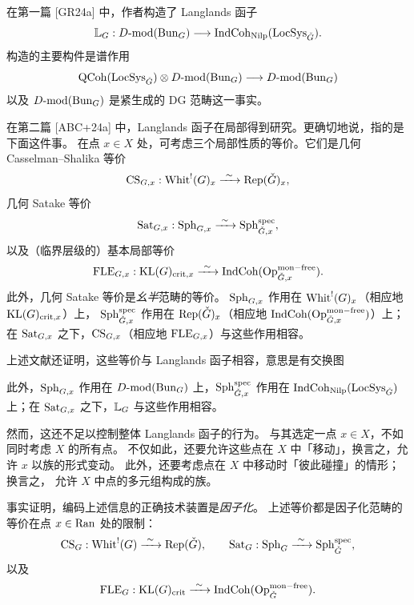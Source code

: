在第一篇 [GR24a] 中，作者构造了 Langlands 函子
\[
\mathbb{L}_G:D\text{-}\mathrm{mod}(\mathrm{Bun}_G)\longrightarrow\mathrm{IndCoh}_{\mathrm{Nilp}}(\mathrm{LocSys}_{\check{G}}).
\]
构造的主要构件是谱作用
\[
\mathrm{QCoh}(\mathrm{LocSys}_{\check{G}})\otimes D\text{-}\mathrm{mod}(\mathrm{Bun}_G)\longrightarrow D\text{-}\mathrm{mod}(\mathrm{Bun}_G)
\]
以及 $D\text{-}\mathrm{mod}(\mathrm{Bun}_G)$ 是紧生成的 DG 范畴这一事实。

在第二篇 [ABC+24a] 中，Langlands 函子在局部得到研究。更确切地说，指的是下面这件事。
在点 $x\in X$ 处，可考虑三个局部性质的等价。它们是几何 Casselman–Shalika 等价
\[
\CS_{G,x}:\Whit^{!}(G)_x\xrightarrow{\ \sim\ }\Rep(\Gd)_x,
\]
几何 Satake 等价
\[
\Sat_{G,x}:\Sph_{G,x}\xrightarrow{\ \sim\ }\Sph^{\spec}_{\Gd,x},
\]
以及（临界层级的）基本局部等价
\[
\FLE_{G,x}:\KL(G)_{\mathrm{crit},x}\xrightarrow{\ \sim\ }
\IndCoh(\Op^{\monfree}_{\Gd,x}).
\]
此外，几何 Satake 等价是\emph{幺半}范畴的等价。
$\mathrm{Sph}_{G,x}$ 作用在 $\mathrm{Whit}^{!}(G)_x$（相应地 $\mathrm{KL}(G)_{\mathrm{crit},x}$）上，
$\mathrm{Sph}^{\mathrm{spec}}_{\check{G},x}$ 作用在 $\mathrm{Rep}(\check{G})_x$（相应地 $\mathrm{IndCoh}(\mathrm{Op}^{\mathrm{mon-free}}_{\check{G},x})$）上；
在 $\mathrm{Sat}_{G,x}$ 之下，$\mathrm{CS}_{G,x}$（相应地 $\mathrm{FLE}_{G,x}$）与这些作用相容。

上述文献还证明，这些等价与 Langlands 函子相容，意思是有交换图
\begin{center}
\end{center}

此外，$\mathrm{Sph}_{G,x}$ 作用在 $D\text{-}\mathrm{mod}(\mathrm{Bun}_G)$ 上，$\mathrm{Sph}^{\mathrm{spec}}_{\check{G},x}$ 作用在
$\mathrm{IndCoh}_{\mathrm{Nilp}}(\mathrm{LocSys}_{\check{G}})$ 上；在 $\mathrm{Sat}_{G,x}$ 之下，$\mathbb{L}_G$ 与这些作用相容。

然而，这还不足以控制整体 Langlands 函子的行为。
与其选定一点 $x\in X$，不如同时考虑 $X$ 的所有点。
不仅如此，还要允许这些点在 $X$ 中「移动」，换言之，允许 $x$ 以族的形式变动。
此外，还要考虑点在 $X$ 中移动时「彼此碰撞」的情形；换言之，
允许 $X$ 中点的多元组构成的族。

事实证明，编码上述信息的正确技术装置是\emph{因子化}。
上述等价都是因子化范畴的等价在点 $x\in\mathrm{Ran}$ 处的限制：
\[
\CS_G:\Whit^{!}(G)\xrightarrow{\ \sim\ }\Rep(\Gd),\qquad
\Sat_G:\Sph_G\xrightarrow{\ \sim\ }\Sph^{\spec}_{\Gd},
\]
以及
\[
\FLE_G:\KL(G)_{\mathrm{crit}}\xrightarrow{\ \sim\ }\IndCoh(\Op^{\monfree}_{\Gd}).
\]

